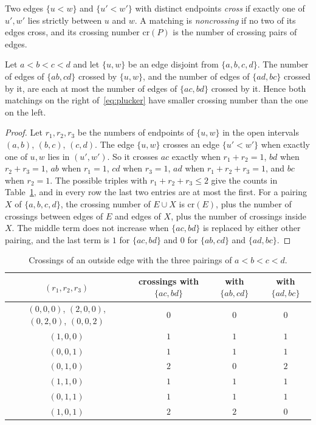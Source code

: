 Two edges $\{u<w\}$ and $\{u'<w'\}$ with distinct endpoints \emph{cross} if exactly one of $u',w'$ lies strictly between $u$ and $w$. A matching is \emph{noncrossing} if no two of its edges cross, and its crossing number $\mathrm{cr}(P)$ is the number of crossing pairs of edges.

\begin{lemma}\label{lem:crossing}
Let $a<b<c<d$ and let $\{u,w\}$ be an edge disjoint from $\{a,b,c,d\}$. The number of edges of $\{ab,cd\}$ crossed by $\{u,w\}$, and the number of edges of $\{ad,bc\}$ crossed by it, are each at most the number of edges of $\{ac,bd\}$ crossed by it. Hence both matchings on the right of~\eqref{eq:plucker} have smaller crossing number than the one on the left.
\end{lemma}

\begin{proof}
Let $r_1,r_2,r_3$ be the numbers of endpoints of $\{u,w\}$ in the open intervals $(a,b)$, $(b,c)$, $(c,d)$. The edge $\{u,w\}$ crosses an edge $\{u'<w'\}$ when exactly one of $u,w$ lies in $(u',w')$. So it crosses $ac$ exactly when $r_1+r_2=1$, $bd$ when $r_2+r_3=1$, $ab$ when $r_1=1$, $cd$ when $r_3=1$, $ad$ when $r_1+r_2+r_3=1$, and $bc$ when $r_2=1$. The possible triples with $r_1+r_2+r_3\le2$ give the counts in Table~\ref{tab:crossing}, and in every row the last two entries are at most the first. For a pairing $X$ of $\{a,b,c,d\}$, the crossing number of $E\cup X$ is $\mathrm{cr}(E)$, plus the number of crossings between edges of $E$ and edges of $X$, plus the number of crossings inside $X$. The middle term does not increase when $\{ac,bd\}$ is replaced by either other pairing, and the last term is $1$ for $\{ac,bd\}$ and $0$ for $\{ab,cd\}$ and $\{ad,bc\}$.
\end{proof}

\begin{table}[ht]
\centering
\begin{tabular}{cccc}
\toprule
$(r_1,r_2,r_3)$ & crossings with $\{ac,bd\}$ & with $\{ab,cd\}$ & with $\{ad,bc\}$\\
\midrule
$(0,0,0)$, $(2,0,0)$, $(0,2,0)$, $(0,0,2)$ & $0$ & $0$ & $0$\\
$(1,0,0)$ & $1$ & $1$ & $1$\\
$(0,0,1)$ & $1$ & $1$ & $1$\\
$(0,1,0)$ & $2$ & $0$ & $2$\\
$(1,1,0)$ & $1$ & $1$ & $1$\\
$(0,1,1)$ & $1$ & $1$ & $1$\\
$(1,0,1)$ & $2$ & $2$ & $0$\\
\bottomrule
\end{tabular}
\caption{Crossings of an outside edge with the three pairings of $a<b<c<d$.}\label{tab:crossing}
\end{table}

